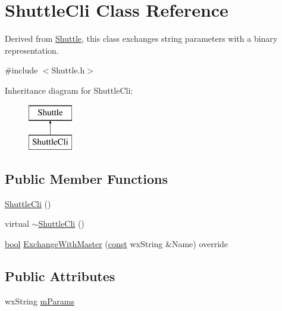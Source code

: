\hypertarget{class_shuttle_cli}{}\section{Shuttle\+Cli Class Reference}
\label{class_shuttle_cli}


Derived from \hyperlink{class_shuttle}{Shuttle}, this class exchanges string parameters with a binary representation.  




{\ttfamily \#include $<$Shuttle.\+h$>$}

Inheritance diagram for Shuttle\+Cli\+:\begin{figure}[H]
\begin{center}
\leavevmode
\includegraphics[height=2.000000cm]{class_shuttle_cli}
\end{center}
\end{figure}
\subsection*{Public Member Functions}
\begin{DoxyCompactItemize}
\item 
\hyperlink{class_shuttle_cli_ac712de2f4b6a6b0cdcf0fcedca0fae3a}{Shuttle\+Cli} ()
\item 
virtual \hyperlink{class_shuttle_cli_a4df64f34f69f2029868aa9e577396754}{$\sim$\+Shuttle\+Cli} ()
\item 
\hyperlink{mac_2config_2i386_2lib-src_2libsoxr_2soxr-config_8h_abb452686968e48b67397da5f97445f5b}{bool} \hyperlink{class_shuttle_cli_ab5a3f23b21633b14d57af0932cc1e54c}{Exchange\+With\+Master} (\hyperlink{getopt1_8c_a2c212835823e3c54a8ab6d95c652660e}{const} wx\+String \&Name) override
\end{DoxyCompactItemize}
\subsection*{Public Attributes}
\begin{DoxyCompactItemize}
\item 
wx\+String \hyperlink{class_shuttle_cli_aad36ba887802e4aa6b4a46e9ca8c4b7e}{m\+Params}
\end{DoxyCompactItemize}


